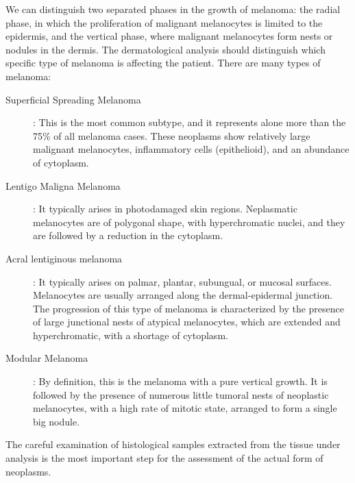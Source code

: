 
    We can distinguish two separated phases in the growth of melanoma: the radial phase, in which the proliferation of malignant melanocytes is limited to the epidermis, and the vertical phase, where malignant melanocytes form nests or nodules in the dermis. The dermatological analysis should distinguish which specific type of melanoma is affecting the patient. There are many types of melanoma:
    \begin{description}
        \item [Superficial Spreading Melanoma]: This is the most common subtype, and it represents alone more than the 75\% of all melanoma cases. These neoplasms show relatively large malignant melanocytes, inflammatory cells (epithelioid), and an abundance of cytoplasm.

        \item [Lentigo Maligna Melanoma]: It typically arises in photodamaged skin regions. Neplasmatic melanocytes are of polygonal shape, with hyperchromatic nuclei, and they are followed by a reduction in the cytoplasm.

        \item [Acral lentiginous melanoma]: It typically arises on palmar, plantar, subungual, or mucosal surfaces. Melanocytes are usually arranged along the dermal-epidermal junction. The progression of this type of melanoma is characterized by the presence of large junctional nests of atypical melanocytes, which are extended and hyperchromatic, with a shortage of cytoplasm.

        \item [Modular Melanoma]: By definition, this is the melanoma with a pure vertical growth. It is followed by the presence of numerous little tumoral nests of neoplastic melanocytes, with a high rate of mitotic state, arranged to form a single big nodule.
    \end{description}

    The careful examination of histological samples extracted from the tissue under analysis is the most important step for the assessment of the actual form of neoplasms.
